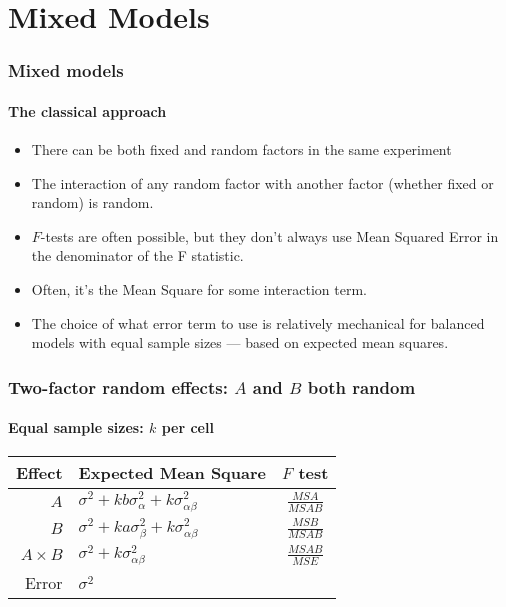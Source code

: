 \documentclass[serif]{beamer} %
\begin{document}
\section{Mixed Models}

\begin{frame}
\frametitle{Mixed models}
\framesubtitle{The classical approach} 
  \begin{itemize}
    \item There can be both fixed and random factors in the same experiment
    \item The interaction of any random factor with another factor (whether fixed or  random) is random.
    \item $F$-tests are often possible, but they don't always use Mean Squared Error in the denominator of the F statistic.
    \item Often, it's the Mean Square for some interaction term.
    \item The choice of what error term to use is relatively mechanical for balanced models with equal sample sizes --- based on expected mean squares.
  \end{itemize}
\end{frame}

\begin{frame}
\frametitle{Two-factor random effects: $A$ and $B$ both random}
\framesubtitle{Equal sample sizes: $k$ per cell} 
\begin{center}
\renewcommand{\arraystretch}{1.5}
\begin{tabular}{rlc}  \hline
Effect       &   Expected Mean Square &   $F$ test   \\ \hline
$A$          & $\sigma^2 + kb\sigma^2_\alpha + k\sigma^2_{\alpha\beta}$ 
& $\frac{MSA}{MSAB}$   \\ 
$B$          & $\sigma^2 + ka\sigma^2_\beta + k\sigma^2_{\alpha\beta}$ 
&  $\frac{MSB}{MSAB}$  \\ 
$A \times B$ & $\sigma^2 + k\sigma^2_{\alpha\beta}$  &  $\frac{MSAB}{MSE}$  \\
Error        & $\sigma^2$            &   
\end{tabular}
\renewcommand{\arraystretch}{1.0}
\end{center}
\end{frame}
\end{document}

